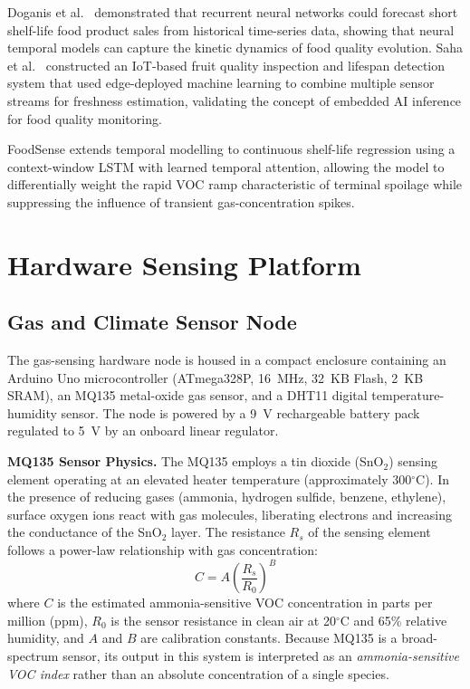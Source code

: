 \documentclass{ieeeaccess}
\begin{document}
Doganis et al.~\cite{Doganis2006} demonstrated that recurrent neural networks could forecast short shelf-life food product sales from historical time-series data, showing that neural temporal models can capture the kinetic dynamics of food quality evolution. Saha et al.~\cite{Saha2023} constructed an IoT-based fruit quality inspection and lifespan detection system that used edge-deployed machine learning to combine multiple sensor streams for freshness estimation, validating the concept of embedded AI inference for food quality monitoring.

FoodSense extends temporal modelling to continuous shelf-life regression using a context-window LSTM with learned temporal attention, allowing the model to differentially weight the rapid VOC ramp characteristic of terminal spoilage while suppressing the influence of transient gas-concentration spikes.

\section{Hardware Sensing Platform}
\label{sec:hardware}

\subsection{Gas and Climate Sensor Node}

The gas-sensing hardware node is housed in a compact enclosure containing an Arduino Uno microcontroller (ATmega328P, 16~MHz, 32~KB Flash, 2~KB SRAM), an MQ135 metal-oxide gas sensor, and a DHT11 digital temperature-humidity sensor. The node is powered by a 9~V rechargeable battery pack regulated to 5~V by an onboard linear regulator.

\textbf{MQ135 Sensor Physics.} The MQ135 employs a tin dioxide (SnO$_2$) sensing element operating at an elevated heater temperature (approximately 300$^{\circ}$C). In the presence of reducing gases (ammonia, hydrogen sulfide, benzene, ethylene), surface oxygen ions react with gas molecules, liberating electrons and increasing the conductance of the SnO$_2$ layer. The resistance $R_s$ of the sensing element follows a power-law relationship with gas concentration:
\begin{equation}
  C = A \left(\frac{R_s}{R_0}\right)^{B}
  \label{eq:powerlaw}
\end{equation}
where $C$ is the estimated ammonia-sensitive VOC concentration in parts per million (ppm), $R_0$ is the sensor resistance in clean air at 20$^{\circ}$C and 65\% relative humidity, and $A$ and $B$ are calibration constants. Because MQ135 is a broad-spectrum sensor, its output in this system is interpreted as an \textit{ammonia-sensitive VOC index} rather than an absolute concentration of a single species.
\end{document}
